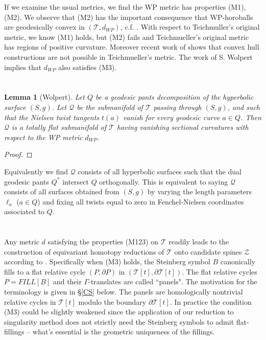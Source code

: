 \documentclass[12pt]{amsart}
\newtheorem{lem}[thm]{Lemma}
\theoremstyle{definition}
\theoremstyle{remark}
\newcommand{\del}{\partial}
\newcommand{\sT}{\mathscr{T}}
\newcommand{\sZ}{\mathscr{Z}}
\begin{document}
If we examine the usual metrics, we find the WP metric has properties (M1), (M2). We observe that (M2) has the important consequence that WP-horoballs are geodesically convex in $(\sT, d_{WP})$, c.f. \cite{GroCurv}. With respect to Teichmuller's original metric, we know (M1) holds, but (M2) fails and Teichmueller's original metric has regions of positive curvature. Moreover recent work of \cite{RafiBourque} shows that convex hull constructions are not possible in Teichmueller's metric. The work of S. Wolpert implies that $d_{WP}$ also satisfies (M3). 


\section{}

\begin{lem}[Wolpert]
Let $Q$ be a geodesic pants decomposition of the hyperbolic surface $(S,g)$. Let $\mathscr{Q}$ be the submanifold of $\sT$ passing through $(S,g)$, and such that the Nielsen twist tangents $t(a)$ vanish for every geodesic curve $a \in Q$. Then $\mathscr{Q}$ is a totally flat submanifold of $\sT$ having vanishing sectional curvatures with respect to the WP metric $d_{WP}$. 
\end{lem}
\begin{proof}

\end{proof}

Equivalently we find $\mathscr{Q}$ consists of all hyperbolic surfaces such that the dual geodesic pants $Q^*$ intersect $Q$ orthogonally. This is equivalent to saying $\mathscr{Q}$ consists of all surfaces obtained from $(S,g)$ by varying the length parameters $\ell_a$ ($a\in Q$) and fixing all twists equal to zero in Fenchel-Nielsen coordinates associated to $Q$. 



\section{}

Any metric $d$ satisfying the properties (M123) on $\sT$ readily leads to the construction of equivariant homotopy reductions of $\sT$ onto candidate spines $\sZ$ according to \cite{martel}. Specifically when (M3) holds, the Steinberg symbol $B$ canonically fills to a flat relative cycle $(P, \del P)$ in $(\sT[t], \del \sT[t])$. The flat relative cycles $P=FILL[B]$ and their $\Gamma$-translates are called ``panels". The motivation for the terminology is given in \S \ref{CS} below. The panels are homologically nontrivial relative cycles in $\sT[t]$ modulo the boundary $\del \sT[t]$. In practice the condition (M3) could be slightly weakened since the application of our reduction to singularity method \cite{martel} does not strictly need the Steinberg symbols to admit flat-fillings -- what's essential is the geometric uniqueness of the fillings.
\end{document}
